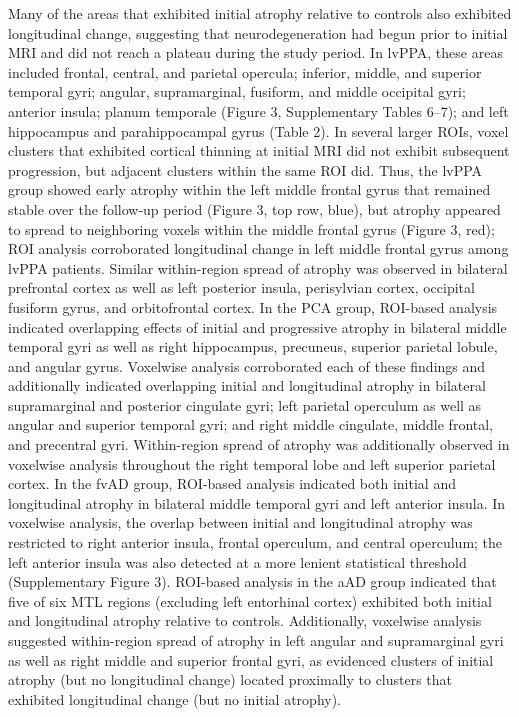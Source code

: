 \documentclass[]{article}
\begin{document}
Many of the areas that exhibited initial atrophy relative to controls
also exhibited longitudinal change, suggesting that neurodegeneration
had begun prior to initial MRI and did not reach a plateau during the
study period. In lvPPA, these areas included frontal, central, and
parietal opercula; inferior, middle, and superior temporal gyri;
angular, supramarginal, fusiform, and middle occipital gyri; anterior
insula; planum temporale (Figure 3, Supplementary Tables 6--7); and left
hippocampus and parahippocampal gyrus (Table 2). In several larger ROIs,
voxel clusters that exhibited cortical thinning at initial MRI did not
exhibit subsequent progression, but adjacent clusters within the same
ROI did. Thus, the lvPPA group showed early atrophy within the left
middle frontal gyrus that remained stable over the follow-up period
(Figure 3, top row, blue), but atrophy appeared to spread to neighboring
voxels within the middle frontal gyrus (Figure 3, red); ROI analysis
corroborated longitudinal change in left middle frontal gyrus among
lvPPA patients. Similar within-region spread of atrophy was observed in
bilateral prefrontal cortex as well as left posterior insula,
perisylvian cortex, occipital fusiform gyrus, and orbitofrontal cortex.
In the PCA group, ROI-based analysis indicated overlapping effects of
initial and progressive atrophy in bilateral middle temporal gyri as
well as right hippocampus, precuneus, superior parietal lobule, and
angular gyrus. Voxelwise analysis corroborated each of these findings
and additionally indicated overlapping initial and longitudinal atrophy
in bilateral supramarginal and posterior cingulate gyri; left parietal
operculum as well as angular and superior temporal gyri; and right
middle cingulate, middle frontal, and precentral gyri. Within-region
spread of atrophy was additionally observed in voxelwise analysis
throughout the right temporal lobe and left superior parietal cortex. In
the fvAD group, ROI-based analysis indicated both initial and
longitudinal atrophy in bilateral middle temporal gyri and left anterior
insula. In voxelwise analysis, the overlap between initial and
longitudinal atrophy was restricted to right anterior insula, frontal
operculum, and central operculum; the left anterior insula was also
detected at a more lenient statistical threshold (Supplementary Figure
3). ROI-based analysis in the aAD group indicated that five of six MTL
regions (excluding left entorhinal cortex) exhibited both initial and
longitudinal atrophy relative to controls. Additionally, voxelwise
analysis suggested within-region spread of atrophy in left angular and
supramarginal gyri as well as right middle and superior frontal gyri, as
evidenced clusters of initial atrophy (but no longitudinal change)
located proximally to clusters that exhibited longitudinal change (but
no initial atrophy).
\end{document}

